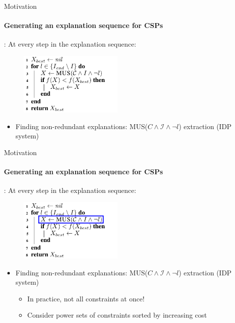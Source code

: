 \documentclass{beamer}
\newcommand\m[1]{\ensuremath{#1}\xspace}
\newcommand\formulac{\ensuremath{\m{C} }\xspace}
\begin{document}
	\begin{frame}{Motivation}
		\framesubtitle{Generating an explanation sequence for CSPs}
\cite{bogaerts2020step}: At every step in the explanation sequence:
		\begin{figure}
			\includegraphics[width=0.45\textwidth]{algo_mus2.png}
		\end{figure}
		\begin{itemize}
			\item Finding non-redundant explanations: MUS($\formulac \land \mathcal{I} \land \neg l$) extraction (IDP system)
			
		\end{itemize}
	\end{frame}

	\begin{frame}{Motivation}
	\framesubtitle{Generating an explanation sequence for CSPs}
\cite{bogaerts2020step}: At every step in the explanation sequence:
	\begin{figure}
		\includegraphics[width=0.45\textwidth]{algo_mus2_b.png}
	\end{figure}
	\begin{itemize}
		\item Finding non-redundant explanations: MUS($\formulac \land \mathcal{I} \land \neg l $) extraction (IDP system)
		
		\begin{itemize}
			\item In practice, not all constraints at once!
			\item Consider power sets of constraints sorted by increasing cost
		\end{itemize}
	\end{itemize}
\end{frame}
\end{document}

